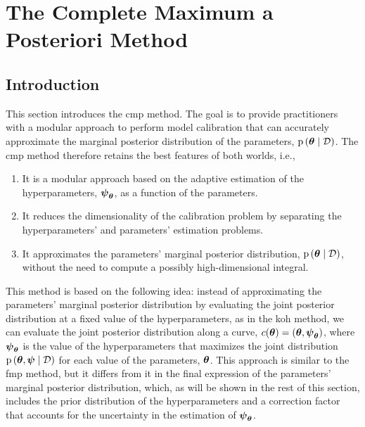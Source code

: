%


\chapter{The Complete Maximum a Posteriori Method}
\label{sec:cmp}


\section{Introduction}
\label{sc:cmp:intro}

This section introduces the \gls{cmp} method. The goal is to provide practitioners with a modular approach to perform model calibration that can accurately approximate the marginal posterior distribution of the parameters, $\mathrm{p} \left( \boldsymbol{\theta} \mid \mathcal{D} \right)$. The \gls{cmp} method therefore retains the best features of both worlds, i.e.,

\begin{enumerate}
    \item It is a modular approach based on the adaptive estimation of the hyperparameters, $\boldsymbol{\psi}_{\boldsymbol{\theta}}$, as a function of the parameters.
    \item It reduces the dimensionality of the calibration problem by separating the hyperparameters' and parameters' estimation problems.
    \item It approximates the parameters' marginal posterior distribution, $\mathrm{p} \left( \boldsymbol{\theta} \mid \mathcal{D} \right)$, without the need to compute a possibly high-dimensional integral.
\end{enumerate}

This method is based on the following idea: instead of approximating the parameters' marginal posterior distribution by evaluating the joint posterior distribution at a fixed value of the hyperparameters, as in the \gls{koh} method, we can evaluate the joint posterior distribution along a curve, $c(\boldsymbol{\theta}) = \left(\boldsymbol{\theta}, \boldsymbol{\psi}_{\boldsymbol{\theta}}\right)$, where $\boldsymbol{\psi}_{\boldsymbol{\theta}}$ is the value of the hyperparameters that maximizes the joint distribution $\mathrm{p} \left( \boldsymbol{\theta}, \boldsymbol{\psi} \mid \mathcal{D} \right)$ for each value of the parameters, $\boldsymbol{\theta}$. This approach is similar to the \gls{fmp} method, but it differs from it in the final expression of the parameters' marginal posterior distribution, which, as will be shown in the rest of this section, includes the prior distribution of the hyperparameters and a correction factor that accounts for the uncertainty in the estimation of $\boldsymbol{\psi}_{\boldsymbol{\theta}}$.

